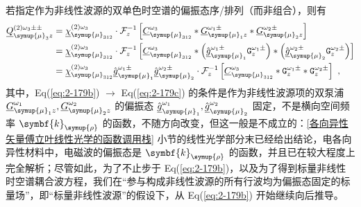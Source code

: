 若指定作为非线性波源的双单色时空谱的偏振态序/排列（而非组合），则有
\begin{subequations} \label{eq:2-179}
	\abovedisplayskip=13pt
	\belowdisplayskip=13pt
	\begin{align}
		\underline{Q}^{(2)\omega_3\pm\pm}_{{\symup{\mu}}_{3} z} &= \underline{\chi}^{(2)\omega_3}_{{\symup{\mu}}_{312}} \cdot \mathcal F^{-1}_{z} \left[ \underline{C}^{\omega_3}_{{\symup{\mu}}_{312}} * \underline{G}^{\omega_1\pm}_{{\symup{\mu}}_1 z} * \underline{G}^{\omega_2\pm}_{{\symup{\mu}}_2 z} \right] \label{eq:2-179a} \\ &= \underline{\chi}^{(2)\omega_3}_{{\symup{\mu}}_{312}} \cdot \mathcal F^{-1}_{z} \left[ \underline{C}^{\omega_3}_{{\symup{\mu}}_{312}} * \left( \hat{\underline{g}}^{\omega_1\pm}_{{\symup{\mu}}_1} {\mathtt{G}}^{\omega_1\pm}_{z} \right) * \left( \hat{\underline{g}}^{\omega_2\pm}_{{\symup{\mu}}_2} {\mathtt{G}}^{\omega_2\pm}_{z} \right) \right] \label{eq:2-179b} \\ &= \underline{\chi}^{(2)\omega_3}_{{\symup{\mu}}_{312}} \hat{\underline{g}}^{\omega_1\pm}_{{\symup{\mu}}_1} \hat{\underline{g}}^{\omega_2\pm}_{{\symup{\mu}}_2} \cdot \mathcal F^{-1}_{z} \left[ \underline{C}^{\omega_3}_{{\symup{\mu}}_{312}} * {\mathtt{G}}^{\omega_1\pm}_{z} * {\mathtt{G}}^{\omega_2\pm}_{z} \right] \label{eq:2-179c}~,
	\end{align}
\end{subequations}
其中，Eq(\ref{eq:2-179b}) $\to$ Eq(\ref{eq:2-179c}) 的条件是作为非线性波源项的双泵浦 $\underline{G}^{\omega_1}_{{\symup{\mu}}_1 z}, \underline{G}^{\omega_2}_{{\symup{\mu}}_2 z}$ 的偏振态 $\hat{\underline{g}}^{\omega_1}_{{\symup{\mu}}_1}, \hat{\underline{g}}^{\omega_2}_{{\symup{\mu}}_2}$ 固定，不是横向空间频率 $\symbf{k}_{\symup{\rho}}$ 的函数，不随方向改变，但这一般是不成立的：\ref{各向异性矢量傅立叶线性光学的函数调用栈} 小节的线性光学部分末已经给出结论，电各向异性材料中，电磁波的偏振态是 $\symbf{k}_{\symup{\rho}}$ 的函数，并且已在较大程度上完全解析；尽管如此，为了不止步于 Eq(\ref{eq:2-179b})，以及为了得到标量非线性时空谱耦合波方程，我们在“参与构成非线性波源的所有行波均为偏振态固定的标量场”，即“标量非线性波源”的假设\label{con:3}下，从 Eq(\ref{eq:2-179b}) 开始继续向后推导。

